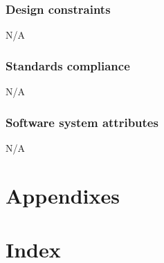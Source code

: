 \documentclass[letterpaper,10pt,titlepage]{article}
\begin{document}
\subsubsection{Design constraints}
N/A

\subsubsection{Standards compliance }
N/A

\subsubsection{Software system attributes }
N/A

\section{Appendixes}

\section{Index}
\newpage

\tableofcontents
\newpage
\end{document}
